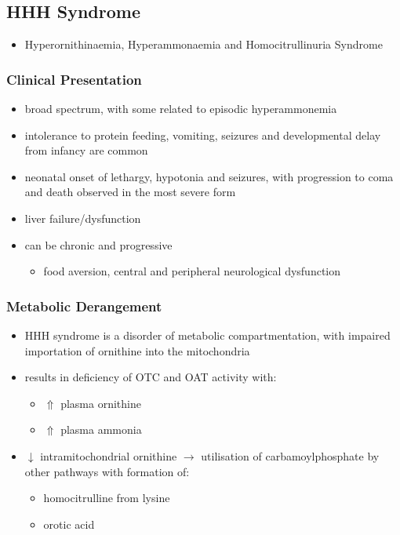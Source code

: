 \documentclass{scrartcl}
\begin{document}
\subsection{HHH Syndrome}
\label{sec:org3cffc01}
\begin{itemize}
\item Hyperornithinaemia, Hyperammonaemia and Homocitrullinuria Syndrome
\end{itemize}
\chemnameinit{}
\subsubsection{Clinical Presentation}
\label{sec:org6dea35a}
\begin{itemize}
\item broad spectrum, with some related to episodic hyperammonemia
\item intolerance to protein feeding, vomiting, seizures and developmental
delay from infancy are common
\item neonatal onset of lethargy, hypotonia and seizures, with progression
to coma and death observed in the most severe form
\item liver failure/dysfunction
\item can be chronic and progressive
\begin{itemize}
\item food aversion, central and peripheral neurological dysfunction
\end{itemize}
\end{itemize}

\subsubsection{Metabolic Derangement}
\label{sec:orgfe6dffd}
\begin{itemize}
\item HHH syndrome is a disorder of metabolic compartmentation, with
impaired importation of ornithine into the mitochondria
\item results in deficiency of OTC and OAT activity with:
\begin{itemize}
\item \(\Uparrow\) plasma ornithine
\item \(\Uparrow\) plasma ammonia
\end{itemize}
\item \(\downarrow\) intramitochondrial ornithine \(\to\) utilisation of
carbamoylphosphate by other pathways with formation of:
\begin{itemize}
\item homocitrulline from lysine
\item orotic acid
\end{itemize}
\end{itemize}
\end{document}
